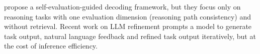 \cite{xie2023decomposition} propose a self-evaluation-guided decoding framework, but they focus only on reasoning tasks with one evaluation dimension (reasoning path consistency) and without retrieval.
% 
Recent work on LLM refinement \citep{dhuliawala2023chainofverification, madaan2023selfrefine, paul2023refiner} prompts a model to generate task output, natural language feedback and refined task output iteratively, but at the cost of inference efficiency.